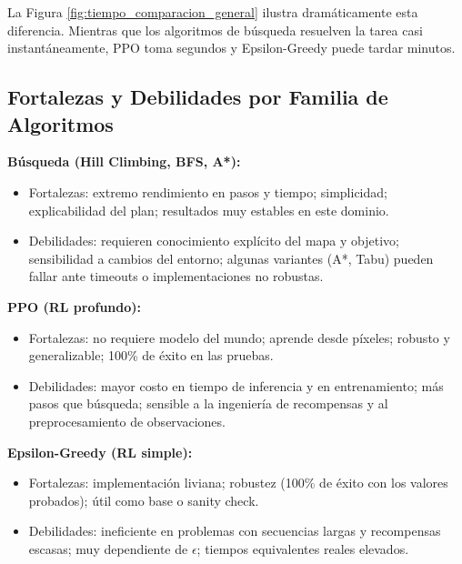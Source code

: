 \documentclass[12pt, oneside, openany]{book}
\begin{document}
La Figura \ref{fig:tiempo_comparacion_general} ilustra dramáticamente esta diferencia. Mientras que los algoritmos de búsqueda resuelven la tarea casi instantáneamente, PPO toma segundos y Epsilon-Greedy puede tardar minutos.

\subsection{Fortalezas y Debilidades por Familia de Algoritmos}
\label{sec:pros_cons}
\noindent\textbf{Búsqueda (Hill Climbing, BFS, A*):}
\begin{itemize}[leftmargin=*]
    \item Fortalezas: extremo rendimiento en pasos y tiempo; simplicidad; explicabilidad del plan; resultados muy estables en este dominio.
    \item Debilidades: requieren conocimiento explícito del mapa y objetivo; sensibilidad a cambios del entorno; algunas variantes (A*, Tabu) pueden fallar ante timeouts o implementaciones no robustas.
\end{itemize}
\noindent\textbf{PPO (RL profundo):}
\begin{itemize}[leftmargin=*]
    \item Fortalezas: no requiere modelo del mundo; aprende desde píxeles; robusto y generalizable; 100\% de éxito en las pruebas.
    \item Debilidades: mayor costo en tiempo de inferencia y en entrenamiento; más pasos que búsqueda; sensible a la ingeniería de recompensas y al preprocesamiento de observaciones.
\end{itemize}
\noindent\textbf{Epsilon-Greedy (RL simple):}
\begin{itemize}[leftmargin=*]
    \item Fortalezas: implementación liviana; robustez (100\% de éxito con los valores probados); útil como base o sanity check.
    \item Debilidades: ineficiente en problemas con secuencias largas y recompensas escasas; muy dependiente de $\epsilon$; tiempos equivalentes reales elevados.
\end{itemize}
\end{document}
